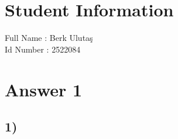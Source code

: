 \documentclass[12pt]{article}
\begin{document}
\section*{Student Information }
Full Name : Berk Ulutaş \\
Id Number :  2522084 \\

\section*{Answer 1}
\subsection*{1)} 
\end{document}
